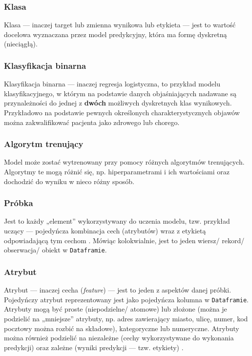 \subsubsection{Klasa}
Klasa --- inaczej target lub zmienna wynikowa lub etykieta --- jest to wartość docelowa wyznaczana przez model predykcyjny, która ma formę dyskretną (nieciągłą).

\subsubsection{Klasyfikacja binarna}
Klasyfikacja binarna --- inaczej regresja logistyczna, to przykład modelu klasyfikacyjnego, w którym na podstawie danych objaśniających nadawane są przynależności do jednej z \textbf{dwóch} możliwych dyskretnych klas wynikowych. Przykładowo na podstawie pewnych określonych charakterystycznych objawów można zakwalifikować pacjenta jako zdrowego lub chorego.

\subsubsection{Algorytm trenujący}
Model może zostać wytrenowany przy pomocy różnych algorytmów trenujących. Algorytmy te mogą różnić się, np. hiperparametrami i ich wartościami oraz dochodzić do wyniku w nieco różny sposób.


\subsubsection{Próbka}
Jest to każdy „element” wykorzystywany do uczenia modelu, tzw. przykład uczący --- pojedyńcza kombinacja cech (atrybutów) wraz z etykietą odpowiadającą tym cechom \cite{geron}. Mówiąc kolokwialnie, jest to jeden wiersz/ rekord/ obserwacja/ obiekt w \verb|Dataframie|.

\subsubsection{Atrybut}
Atrybut --- inaczej cecha (\textit{feature}) --- jest to jeden z aspektów danej próbki. Pojedyńczy atrybut reprezentowany jest jako pojedyńcza kolumna w \verb|Dataframie|. Atrybuty mogą być proste (niepodzielne/ atomowe) lub złożone (można je podzielić na „mniejsze” atrybuty, np. adres zawierający miasto, ulicę, numer, kod pocztowy można rozbić na składowe), kategoryczne lub numeryczne. Atrybuty można również podzielić na niezależne (cechy wykorzystywane do wykonania predykcji) oraz zależne (wyniki predykcji --- tzw. etykiety) \cite{website}.

